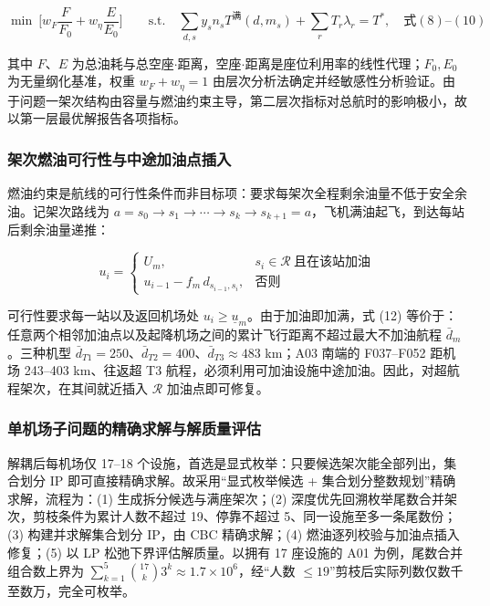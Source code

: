 \documentclass[UTF8,zihao=-4]{ctexart}
\numberwithin{figure}{section}
\numberwithin{table}{section}
\begin{document}
\begin{equation}
  \min\ \Big[w_F\frac{F}{F_0}+w_\eta\frac{E}{E_0}\Big]
  \qquad\text{s.t.}\quad \sum_{d,s}y_s n_s T^{\text{满}}(d,m_s)+\sum_r T_r\lambda_r=T^*,\quad \text{式}(8)\text{--}(10)
\end{equation}

其中 $F$、$E$ 为总油耗与总空座$\cdot$距离，空座$\cdot$距离是座位利用率的线性代理；$F_0,E_0$ 为无量纲化基准，权重 $w_F+w_\eta=1$ 由层次分析法确定并经敏感性分析验证。由于问题一架次结构由容量与燃油约束主导，第二层次指标对总航时的影响极小，故以第一层最优解报告各项指标。

\subsubsection{架次燃油可行性与中途加油点插入}

燃油约束是航线的可行性条件而非目标项：要求每架次全程剩余油量不低于安全余油。记架次路线为 $a=s_0\to s_1\to\cdots\to s_k\to s_{k+1}=a$，飞机满油起飞，到达每站后剩余油量递推：

\begin{equation}
  u_i=\begin{cases}
    U_m, & s_i\in\mathcal{R}\ \text{且在该站加油}\\
    u_{i-1}-f_m\,d_{s_{i-1},s_i}, & \text{否则}
  \end{cases}
\end{equation}

可行性要求每一站以及返回机场处 $u_i\ge\underline{u}_m$。由于加油即加满，式 (12) 等价于：任意两个相邻加油点以及起降机场之间的累计飞行距离不超过最大不加油航程 $\bar d_m$。三种机型 $\bar d_{T1}=250$、$\bar d_{T2}=400$、$\bar d_{T3}\approx483$ km；A03 南端的 F037--F052 距机场 243--403 km、往返超 T3 航程，必须利用可加油设施中途加油。因此，对超航程架次，在其间就近插入 $\mathcal{R}$ 加油点即可修复。

\subsubsection{单机场子问题的精确求解与解质量评估}

解耦后每机场仅 17--18 个设施，首选是显式枚举：只要候选架次能全部列出，集合划分 IP 即可直接精确求解。故采用“显式枚举候选 + 集合划分整数规划”\cite{ref:ilp}精确求解，流程为：(1) 生成拆分候选与满座架次；(2) 深度优先回溯枚举尾数合并架次，剪枝条件为累计人数不超过 19、停靠不超过 5、同一设施至多一条尾数份；(3) 构建并求解集合划分 IP，由 CBC 精确求解；(4) 燃油逐列校验与加油点插入修复；(5) 以 LP 松弛下界评估解质量。以拥有 17 座设施的 A01 为例，尾数合并组合数上界为 $\sum_{k=1}^{5}\binom{17}{k}3^k\approx1.7\times10^6$，经“人数 $\le19$”剪枝后实际列数仅数千至数万，完全可枚举。
\end{document}
